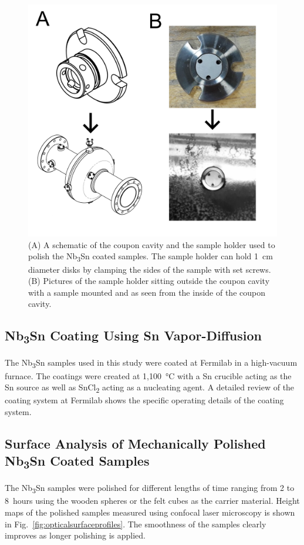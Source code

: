 \documentclass[reprint,amsmath,amssymb,aps]{revtex4-2}%
\begin{document}
\begin{figure}[htb]%
\centering%
\includegraphics[width=\columnwidth]{../doc/figs/Coupon_Cavity.png}%
\caption{(A) A schematic of the coupon cavity and the sample holder used to polish the Nb\textsubscript{3}Sn coated samples. The sample holder can hold 1~cm diameter disks by clamping the sides of the sample with set screws. (B) Pictures of the sample holder sitting outside the coupon cavity with a sample mounted and as seen from the inside of the coupon cavity.}%
\label{fig:couponcavity}%
\end{figure}

%
\subsection{Nb\textsubscript{3}Sn Coating Using Sn Vapor-Diffusion}%
\label{subsec:nb3sncoating}%
The Nb\textsubscript{3}Sn samples used in this study were coated at Fermilab in a high-vacuum furnace. The coatings were created at 1,100~°C with a Sn crucible acting as the Sn source as well as SnCl\textsubscript{2} acting as a nucleating agent. A detailed review of the coating system at Fermilab shows the specific operating details of the coating system\cite{posen2017nb3sn}.

%
\subsection{Surface Analysis of Mechanically Polished Nb\textsubscript{3}Sn Coated Samples}%
\label{subsec:sampleanalysis}%
The Nb\textsubscript{3}Sn samples were polished for different lengths of time ranging from 2 to 8~hours using the wooden spheres or the felt cubes as the carrier material. Height maps of the polished samples measured using confocal laser microscopy is shown in Fig.~\ref{fig:opticalsurfaceprofiles}. The smoothness of the samples clearly improves as longer polishing is applied.
\end{document}
